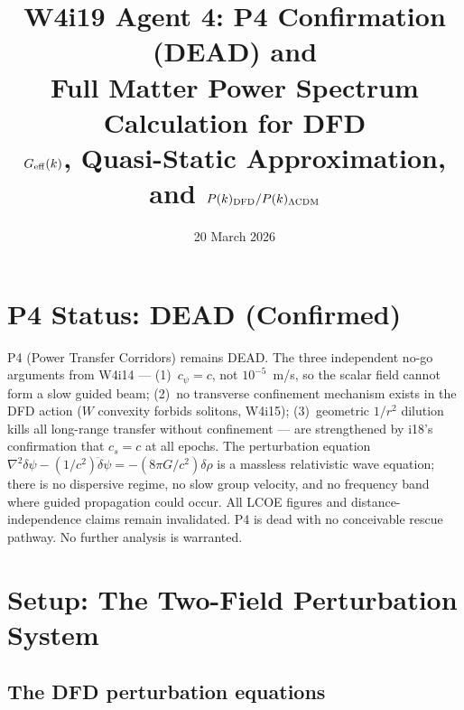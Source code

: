 \documentclass[aps,prd,twocolumn,nofootinbib]{revtex4-2}
\newcommand{\dpsi}{\delta\psi}
\begin{document}
\title{W4i19 Agent 4: P4 Confirmation (DEAD) and\\
Full Matter Power Spectrum Calculation for DFD\\[6pt]
{\normalsize $G_{\rm eff}(k)$, Quasi-Static Approximation, and $P(k)_{\rm DFD}/P(k)_{\Lambda{\rm CDM}}$}}
\date{20 March 2026}
\maketitle

\section{P4 Status: DEAD (Confirmed)}
\label{sec:P4-dead}

P4 (Power Transfer Corridors) remains DEAD. The three independent no-go
arguments from W4i14 --- (1)~$c_\psi = c$, not $10^{-5}$~m/s, so the
scalar field cannot form a slow guided beam; (2)~no transverse confinement
mechanism exists in the DFD action ($W$ convexity forbids solitons,
W4i15); (3)~geometric $1/r^2$ dilution kills all long-range transfer
without confinement --- are strengthened by i18's confirmation that
$c_s = c$ at all epochs. The perturbation equation
$\nabla^2\dpsi - (1/c^2)\ddot\dpsi = -(8\pi G/c^2)\delta\rho$ is a
massless relativistic wave equation; there is no dispersive regime,
no slow group velocity, and no frequency band where guided propagation
could occur. All LCOE figures and distance-independence claims remain
invalidated. P4 is dead with no conceivable rescue pathway. No further
analysis is warranted.

\section{Setup: The Two-Field Perturbation System}
\label{sec:setup}

\subsection{The DFD perturbation equations}
\end{document}
